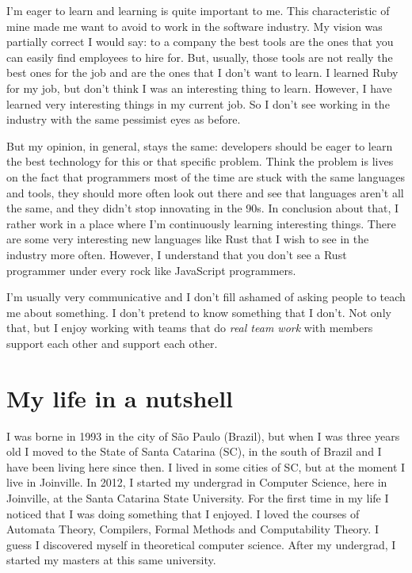 \documentclass[11pt,a4paper,sans]{moderncv}
\begin{document}
\medskip

I'm eager to learn and learning is quite important to me.
This characteristic of mine made me want to avoid to work in the software industry.
My vision was partially correct I would say:
to a company the best tools are the ones that you can easily find employees to hire for.
But, usually, those tools are not really the best ones for the job and are the ones that I don't want to learn.
I learned Ruby for my job, but don't think I was an interesting thing to learn.
However, I have learned very interesting things in my current job.
So I don't see working in the industry with the same pessimist eyes as before.

\medskip

But my opinion, in general, stays the same: developers should be eager to learn the best technology for this or that specific problem.
Think the problem is lives on the fact that programmers most of the time are stuck with the same languages and tools, they should more often look out there and see that languages aren't all the same, and they didn't stop innovating in the 90s.
In conclusion about that, I rather work in a place where I'm continuously learning interesting things.
There are some very interesting new languages like Rust that I wish to see in the industry more often.
However, I understand that you don't see a Rust programmer under every rock like JavaScript programmers.

\medskip

I'm usually very communicative and I don't fill ashamed of asking people to teach me about something.
I don't pretend to know something that I don't.
Not only that, but I enjoy working with teams that do \textit{real team work} with members support each other and support each other.

\section{My life in a nutshell}
I was borne in 1993 in the city of São Paulo (Brazil), but when I was three years old I moved to the State of Santa Catarina (SC), in the south of Brazil and I have been living here since then.
I lived in some cities of SC, but at the moment I live in Joinville.
In 2012, I started my undergrad in Computer Science, here in Joinville, at the Santa Catarina State University.
For the first time in my life I noticed that I was doing something that I enjoyed.
I loved the courses of Automata Theory, Compilers, Formal Methods and Computability Theory.
I guess I discovered myself in theoretical computer science.
After my undergrad, I started my masters at this same university.
\end{document}
